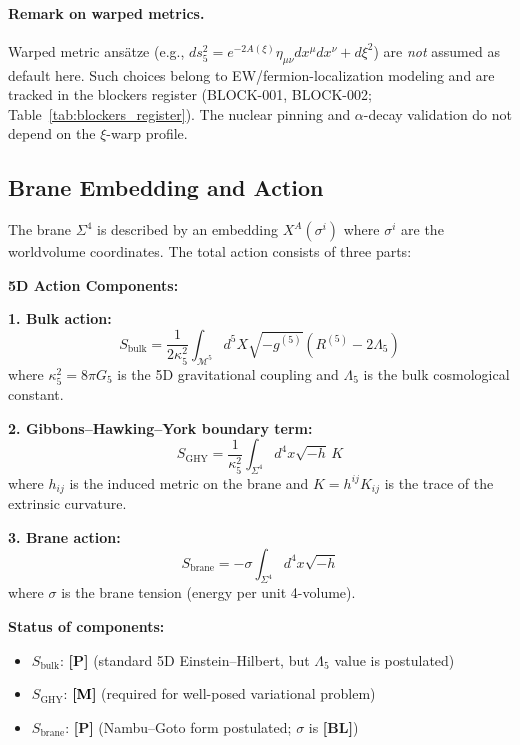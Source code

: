 \documentclass[11pt,a4paper]{article}
\newcommand{\tagP}{\textcolor{red!70!black}{\textbf{[P]}}}
\newcommand{\tagBL}{\textcolor{gray!70!black}{\textbf{[BL]}}}
\newcommand{\tagM}{\textcolor{black}{\textbf{[M]}}}
\begin{document}
\paragraph{Remark on warped metrics.}
Warped metric ans\"atze (e.g., $ds^{2}_{5}=e^{-2A(\xi)}\eta_{\mu\nu}dx^{\mu}dx^{\nu}+d\xi^{2}$) are \emph{not} assumed as default here.
Such choices belong to EW/fermion-localization modeling and are tracked in the blockers register (BLOCK-001, BLOCK-002; Table~\ref{tab:blockers_register}).
The nuclear pinning and $\alpha$-decay validation do not depend on the $\xi$-warp profile.

\subsection{Brane Embedding and Action}

The brane $\Sigma^4$ is described by an embedding $X^A(\sigma^i)$ where $\sigma^i$ are the worldvolume coordinates. The total action consists of three parts:

\begin{derivbox}
\textbf{5D Action Components:}

\textbf{1. Bulk action:}
\begin{equation}
    S_{\text{bulk}} = \frac{1}{2\kappa_5^2} \int_{\mathcal{M}^5} d^5X \sqrt{-g^{(5)}} \left( R^{(5)} - 2\Lambda_5 \right)
    \label{eq:S_bulk}
\end{equation}
where $\kappa_5^2 = 8\pi G_5$ is the 5D gravitational coupling and $\Lambda_5$ is the bulk cosmological constant.

\textbf{2. Gibbons--Hawking--York boundary term:}
\begin{equation}
    S_{\text{GHY}} = \frac{1}{\kappa_5^2} \int_{\Sigma^4} d^4x \sqrt{-h}\, K
    \label{eq:S_GHY}
\end{equation}
where $h_{ij}$ is the induced metric on the brane and $K = h^{ij} K_{ij}$ is the trace of the extrinsic curvature.

\textbf{3. Brane action:}
\begin{equation}
    S_{\text{brane}} = -\sigma \int_{\Sigma^4} d^4x \sqrt{-h}
    \label{eq:S_brane}
\end{equation}
where $\sigma$ is the brane tension (energy per unit 4-volume).
\end{derivbox}

\textbf{Status of components:}
\begin{itemize}
    \item $S_{\text{bulk}}$: \tagP{} (standard 5D Einstein--Hilbert, but $\Lambda_5$ value is postulated)
    \item $S_{\text{GHY}}$: \tagM{} (required for well-posed variational problem)
    \item $S_{\text{brane}}$: \tagP{} (Nambu--Goto form postulated; $\sigma$ is \tagBL{})
\end{itemize}
\end{document}
